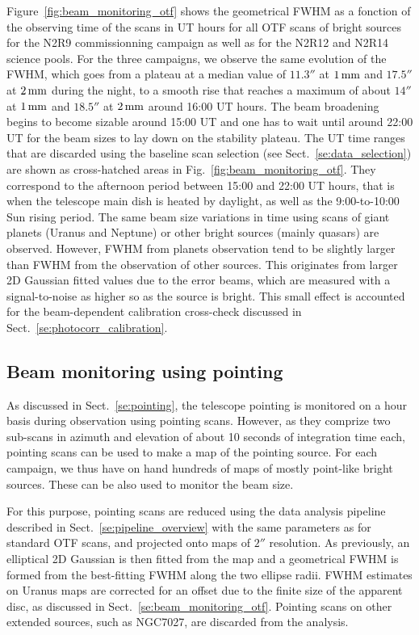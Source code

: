 Figure~\ref{fig:beam_monitoring_otf} shows the geometrical FWHM as a
fonction of the observing time of the scans in UT hours for all OTF
scans of bright sources for the N2R9 commissionning campaign as well
as for the N2R12 and N2R14 science pools. For the three campaigns, we
observe the same evolution of the FWHM, which goes from a plateau at a
median value of $11.3''$ at $1\,\rm{mm}$ and $17.5''$ at $2\,\rm{mm}$
during the night, to a smooth rise that reaches a maximum of about $14''$
at $1\,\rm{mm}$ and $18.5''$ at $2\,\rm{mm}$ around 16:00 UT
hours. The beam broadening begins to become sizable around 15:00 UT
and one has to wait until around 22:00 UT for the beam sizes to lay
down on the stability plateau. The UT time ranges that are discarded
using the baseline scan selection (see
Sect.~\ref{se:data_selection}) are shown as cross-hatched areas in
Fig.~\ref{fig:beam_monitoring_otf}. They correspond to the afternoon
period between 15:00 and 22:00 UT hours, that is when the
telescope main dish is heated by daylight, as well as the
9:00-to-10:00 Sun rising period. The same beam size variations in time
using scans of giant planets (Uranus and Neptune) or other bright
sources (mainly quasars) are observed. However, FWHM from planets
observation tend to be slightly larger than FWHM from the observation
of other sources. This originates from larger 2D Gaussian fitted
values due to the error beams, which are measured with a
signal-to-noise as higher so as the source is bright. This small
effect is accounted for the beam-dependent calibration cross-check
discussed in Sect.~\ref{se:photocorr_calibration}.



\subsection{Beam monitoring using pointing}
\label{se:beam_monitoring_pointing}

As discussed in Sect.~\ref{se:pointing}, the telescope pointing is
monitored on a hour basis during observation using pointing
scans. However, as they comprize two sub-scans in azimuth and
elevation of about 10 seconds of integration time each, pointing scans
can be used to make a map of the pointing source. For each campaign,
we thus have on hand hundreds of maps of mostly point-like bright
sources. These can be also used to monitor the beam size.

For this purpose, pointing scans are reduced using
the data analysis pipeline described in
Sect.~\ref{se:pipeline_overview} with the same parameters as for
standard OTF scans, and projected onto maps of $2''$ resolution.
As previously, an elliptical 2D Gaussian is then fitted from the map
and a geometrical FWHM is formed from the best-fitting FWHM along the
two ellipse radii. FWHM estimates on Uranus maps are corrected for an
offset due to the finite size of the apparent disc, as discussed in
Sect.~\ref{se:beam_monitoring_otf}. Pointing scans on other extended
sources, such as NGC7027, are discarded from the analysis. 

